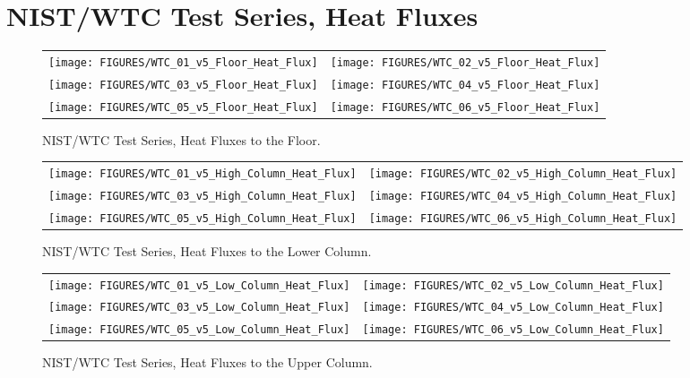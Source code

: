 \clearpage


\section{NIST/WTC Test Series, Heat Fluxes}

\begin{figure}[h]
\begin{tabular*}{\textwidth}{l@{\extracolsep{\fill}}r}
\texttt{[image: FIGURES/WTC\_01\_v5\_Floor\_Heat\_Flux]} &
\texttt{[image: FIGURES/WTC\_02\_v5\_Floor\_Heat\_Flux]} \\
\texttt{[image: FIGURES/WTC\_03\_v5\_Floor\_Heat\_Flux]} &
\texttt{[image: FIGURES/WTC\_04\_v5\_Floor\_Heat\_Flux]} \\
\texttt{[image: FIGURES/WTC\_05\_v5\_Floor\_Heat\_Flux]} &
\texttt{[image: FIGURES/WTC\_06\_v5\_Floor\_Heat\_Flux]}
\end{tabular*}
\caption{NIST/WTC Test Series, Heat Fluxes to the Floor.}
\label{NIST_WTC_Floor_Heat_Flux}
\end{figure}

\begin{figure}[h]
\begin{tabular*}{\textwidth}{l@{\extracolsep{\fill}}r}
\texttt{[image: FIGURES/WTC\_01\_v5\_High\_Column\_Heat\_Flux]} &
\texttt{[image: FIGURES/WTC\_02\_v5\_High\_Column\_Heat\_Flux]} \\
\texttt{[image: FIGURES/WTC\_03\_v5\_High\_Column\_Heat\_Flux]} &
\texttt{[image: FIGURES/WTC\_04\_v5\_High\_Column\_Heat\_Flux]} \\
\texttt{[image: FIGURES/WTC\_05\_v5\_High\_Column\_Heat\_Flux]} &
\texttt{[image: FIGURES/WTC\_06\_v5\_High\_Column\_Heat\_Flux]}
\end{tabular*}
\caption{NIST/WTC Test Series, Heat Fluxes to the Lower Column.}
\label{NIST_WTC_Low_Column_Heat_Flux}
\end{figure}

\begin{figure}[h]
\begin{tabular*}{\textwidth}{l@{\extracolsep{\fill}}r}
\texttt{[image: FIGURES/WTC\_01\_v5\_Low\_Column\_Heat\_Flux]} &
\texttt{[image: FIGURES/WTC\_02\_v5\_Low\_Column\_Heat\_Flux]} \\
\texttt{[image: FIGURES/WTC\_03\_v5\_Low\_Column\_Heat\_Flux]} &
\texttt{[image: FIGURES/WTC\_04\_v5\_Low\_Column\_Heat\_Flux]} \\
\texttt{[image: FIGURES/WTC\_05\_v5\_Low\_Column\_Heat\_Flux]} &
\texttt{[image: FIGURES/WTC\_06\_v5\_Low\_Column\_Heat\_Flux]}
\end{tabular*}
\caption{NIST/WTC Test Series, Heat Fluxes to the Upper Column.}
\label{NIST_WTC_High_Column_Heat_Flux}
\end{figure}

